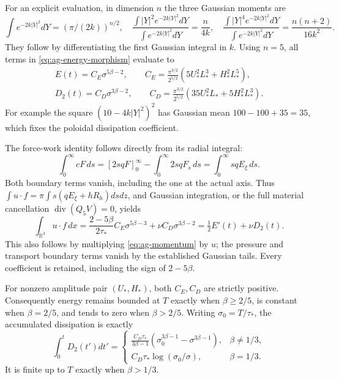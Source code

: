 For an explicit evaluation, in dimension \(n\) the three Gaussian
moments are
\[
 \int e^{-2k|Y|^2}dY=(\pi/(2k))^{n/2},\quad
 \frac{\int |Y|^2e^{-2k|Y|^2}dY}{\int e^{-2k|Y|^2}dY}=\frac{n}{4k},
 \quad
 \frac{\int |Y|^4e^{-2k|Y|^2}dY}{\int e^{-2k|Y|^2}dY}=\frac{n(n+2)}{16k^2}.
\]
They follow by differentiating the first Gaussian integral in \(k\).
Using \(n=5\), all terms in \eqref{eq:ag-energy-morphism} evaluate to
\begin{equation}\label{eq:ag-energy-exact}
 \begin{gathered}
 E(t)=C_E\sigma^{5\beta-2},\qquad
 C_E=\frac{\pi^{3/2}}{2^{5/2}}
                   (5U_*^2L_*^3+H_*^2L_*^5),\\
 D_2(t)=C_D\sigma^{3\beta-2},\qquad
 C_D=\frac{\pi^{3/2}}{2^{5/2}}
                   (35U_*^2L_*+5H_*^2L_*^3).
 \end{gathered}
\end{equation}
For example the square \((10-4k|Y|^2)^2\) has Gaussian mean
\(100-100+35=35\), which fixes the poloidal dissipation coefficient.

The force-work identity follows directly from its radial integral:
\[
 \int_0^\infty cF\,ds
  =[2s qF]_0^\infty-\int_0^\infty2s qF_s\,ds
  =\int_0^\infty s qE_\xi\,ds.
\]
Both boundary terms vanish, including the one at the actual axis.  Thus
\(\int u\cdot f=\pi\int s(qE_\xi+hR_h)dsdz\), and Gaussian
integration, or the full material cancellation
\(\operatorname{div}(Q_5V)=0\), yields
\begin{equation}\label{eq:ag-work}
 \int_{\mathbb R^3}u\cdot f\,dx
 =\frac{2-5\beta}{2\tau_*}C_E\sigma^{5\beta-3}
       +\nu C_D\sigma^{3\beta-2}
 =\tfrac12 E'(t)+\nu D_2(t).
\end{equation}
This also follows by multiplying \eqref{eq:ag-momentum} by \(u\);
the pressure and transport boundary terms vanish by the established
Gaussian tails.  Every coefficient is retained, including the sign of
\(2-5\beta\).

For nonzero amplitude pair \((U_*,H_*)\), both \(C_E,C_D\) are strictly
positive.  Consequently energy remains bounded at \(T\) exactly when
\(\beta\geq2/5\), is constant when \(\beta=2/5\), and tends to zero
when \(\beta>2/5\).  Writing \(\sigma_0=T/\tau_*\), the accumulated
dissipation is exactly
\[
 \int_0^t D_2(t')dt'=
 \begin{cases}
 \displaystyle\frac{C_D\tau_*}{3\beta-1}
       (\sigma_0^{3\beta-1}-\sigma^{3\beta-1}),&\beta\ne1/3,\\[4pt]
 C_D\tau_*\log(\sigma_0/\sigma),&\beta=1/3.
 \end{cases}
\]
It is finite up to \(T\) exactly when \(\beta>1/3\).

